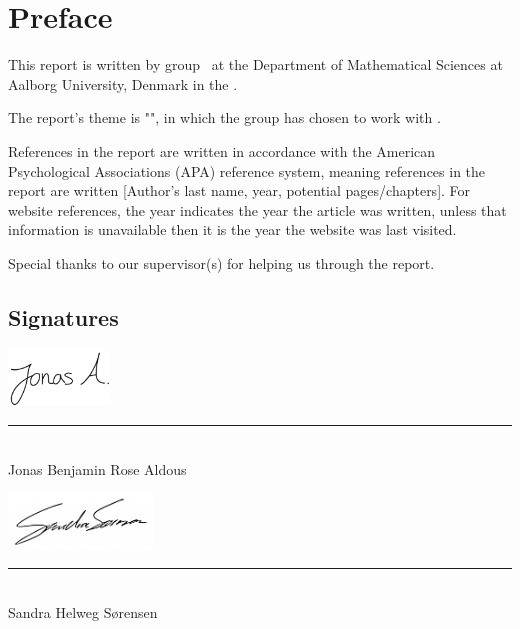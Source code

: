 \chapter*{Preface}\label{Preface}
This report is written by group \projectgroup\, at the Department of Mathematical Sciences at Aalborg University, Denmark in the \MakeLowercase{\projectperiod}.

The report's theme is "\projecttheme", in which the group has chosen to work with \projecttitle.

References in the report are written in accordance with the American Psychological Associations (APA) reference system, meaning references in the report are written [Author's last name, year, potential pages/chapters]. For website references, the year indicates the year the article was written, unless that information is unavailable then it is the year the website was last visited.

Special thanks to our supervisor(s) for helping us through the report.


\section*{Signatures}
\begingroup\centering\vfill\noindent
\begin{minipage}[b]{0.45\textwidth}
 \centering
 \includegraphics[height=1.5cm]{Include/Frontmatter/Signatures/Jonas.PNG}
 \textcolor{AAUgrey1}{\rule{\textwidth}{0.75pt}}\\
 Jonas Benjamin Rose Aldous\\
 {\footnotesize {}}
\end{minipage}
\hfill
\begin{minipage}[b]{0.45\textwidth}
 \centering
 \includegraphics[height=1.5cm]{Include/Frontmatter/Signatures/Sandra.png}
 \textcolor{AAUgrey1}{\rule{\textwidth}{0.75pt}}\\
  Sandra Helweg Sørensen\\
 {\footnotesize {}}
\end{minipage}

\vfill\vfill\noindent\endgroup